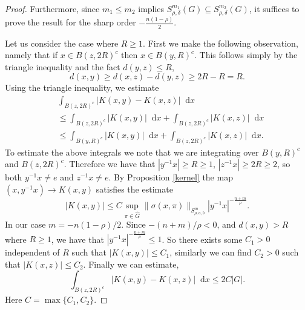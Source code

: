 \documentclass[12pt, reqno]{amsart}
\theoremstyle{definition}
\theoremstyle{remark}
\numberwithin{equation}{section}
\newcommand*\diff{\mathop{}\!\mathrm{d}}
\begin{document}
\begin{proof} Furthermore, since $m_1 \leq m_2$ implies $S^{m_1}_{\rho,\delta}(G) \subseteq S^{m_2}_{\rho,\delta}(G)$, it suffices to prove the result for the sharp order $-\frac{n(1-\rho)}{2}$.


Let us consider the case where $R\geq 1$. First we make the following observation, namely that if $x\in B(z,2R)^c$ then $x\in B(y,R)^c$. This follows simply by the triangle inequality and the fact $d(y,z)\leq R$,
   \begin{equation*}
       d(x,y)\geq d(x,z)-d(y,z)\geq 2R-R=R.
   \end{equation*}
Using the triangle inequality, we estimate 
\begin{equation*}
\begin{aligned}
    &\int_{B(z, 2R)^c}|K(x,y)-K(x,z)|\diff{x}\\
       &\leq\int_{B(z, 2R)^c}|K(x,y)|\diff{x}+\int_{B(z, 2R)^c}|K(x,z)|\diff{x}\\
       &\leq\int_{B(y,R)^c}|K(x,y)|\diff{x}+\int_{B(z, 2R)^c}|K(x,z)|\diff{x}.
\end{aligned}
\end{equation*}
 To estimate the above integrals we note that we are integrating over $B(y,R)^c$ and $B(z,2R)^c$. Therefore we have that $|y^{-1}x|\geq R\geq1$, $|z^{-1}x|\geq 2R\geq2$, so both $y^{-1}x\neq e$ and $z^{-1}x\neq e$. By Proposition \ref{kernel} the map $(x,y^{-1}x)\to K(x,y)$ satisfies the estimate
 \begin{equation*}
     |K(x,y)|\leq C\sup_{\pi\in\widehat{G}}\|\sigma(x,\pi)\|_{S^{m}_{\rho,a,b}}|y^{-1}x|^{-\frac{n+m}{\rho}}.
 \end{equation*}
 In our case $m=-n(1-\rho)/2$. Since $-(n+m)/\rho<0$, and $d(x,y)>R$ where $R\geq 1$, we have that $|y^{-1}x|^{-\frac{n+m}{\rho}}\leq 1$. So there exists some $C_1>0$ independent of $R$ such that $|K(x,y)|\leq C_1$, similarly we can find $C_2>0$ such that $|K(x,z)|\leq C_2$. Finally we can estimate, 
   \begin{equation*}
       \int_{B(z, 2R)^c}|K(x,y)-K(x,z)|\diff{x}\leq 2C|G|.
   \end{equation*}
   Here $C=\max\{C_1,C_2\}$. 
   

\end{proof}
\end{document}
